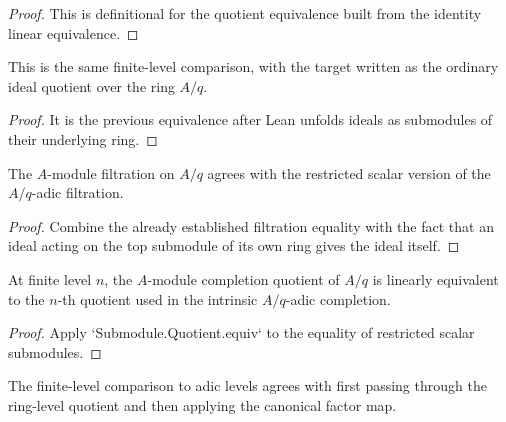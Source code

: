 \begin{proof}
  This is definitional for the quotient equivalence built from the identity
  linear equivalence.
\end{proof}

\begin{definition}
  \label{def:quotient_module_level_to_ring_level_equiv}
  This is the same finite-level comparison, with the target written as the
  ordinary ideal quotient over the ring \(A/q\).
\end{definition}

\begin{proof}
  It is the previous equivalence after Lean unfolds ideals as submodules of
  their underlying ring.
\end{proof}

\begin{lemma}
  \label{lem:quotient_module_filtration_eq_adic_restrict_scalars}
  The \(A\)-module filtration on \(A/q\) agrees with the restricted scalar
  version of the \(A/q\)-adic filtration.
\end{lemma}

\begin{proof}
  Combine the already established filtration equality with the fact that an
  ideal acting on the top submodule of its own ring gives the ideal itself.
\end{proof}

\begin{definition}
  \label{def:quotient_module_level_to_adic_level_equiv}
  At finite level \(n\), the \(A\)-module completion quotient of \(A/q\) is
  linearly equivalent to the \(n\)-th quotient used in the intrinsic
  \(A/q\)-adic completion.
\end{definition}

\begin{proof}
  Apply `Submodule.Quotient.equiv` to the equality of restricted scalar
  submodules.
\end{proof}

\begin{lemma}
  \label{lem:quotient_module_level_to_adic_level_equiv_eq_factor_ring_level}
  The finite-level comparison to adic levels agrees with first passing through
  the ring-level quotient and then applying the canonical factor map.
\end{lemma}

